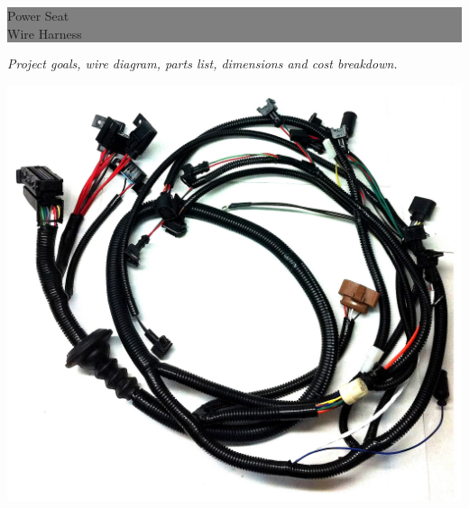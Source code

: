 \documentclass[12pt,letterpaper]{article}
\begin{document}
\newcommand{\getx}[1] {\StrBetween{#1}{(}{,}}
\newcommand{\gety}[1] {\StrBetween{#1}{,}{)}}
\def\mydef#1#2{\def#1{#2}}
\def\uncoord#1#2#3{\def#2{\getx{#1}}\def#3{\gety{#1}}}

\newcommand{\busline}[2] {\draw[thick] #1--#2;}


\begin{titlepage} %
	
	
	\colorbox{grey}{
		\parbox[t]{0.93\textwidth}{ %
			\parbox[t]{0.91\textwidth}{ %
				\raggedleft %
				\fontsize{50pt}{50pt}\selectfont %
				\vspace{0.7cm} %
				
				Power Seat \\ 
				Wire Harness\\
				
				\vspace{0.7cm} %
			}
		}
	}

	\parbox[t]{0.93\textwidth}{
		\raggedleft
	    \vspace{0.7cm}
		\textit{Project goals, wire diagram, parts list, dimensions and cost breakdown.}
	}
	\center
    \includegraphics[width=0.70\linewidth]{wireharness.jpg}


\end{titlepage}
\end{document}
